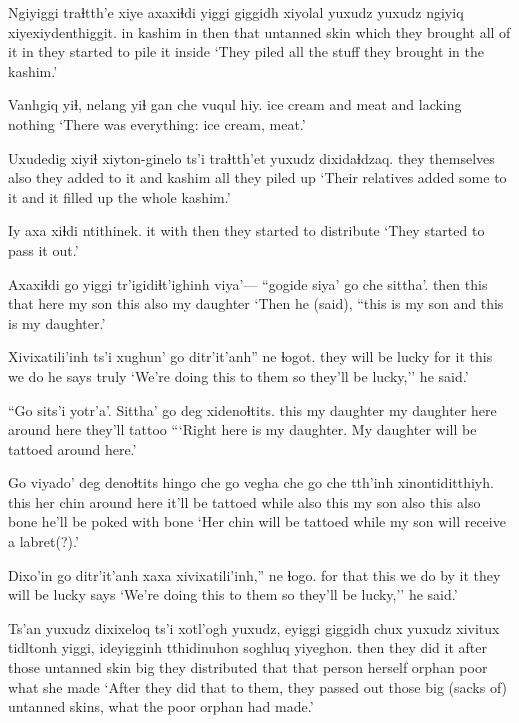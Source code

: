 \documentclass[12pt]{article}
\begin{document}
\gll Ngiyiggi traɬtth'e xiye axaxiɬdi yiggi giggidh       xiyolal           {yuxudz yuxudz} ngiyiq xiyexiydenthiggit. 
in       kashim    in   then   that  {untanned skin} {which they brought} {all of it} in     {they started to pile it inside}
\glt `They piled all the stuff they brought in the kashim.'
\glend

\gll Vanhgiq   yiɬ, nelang yiɬ {gan che vuqul hiy}.
{ice cream} and  meat   and {lacking nothing}
\glt `There was everything: ice cream, meat.'
\glend

\gll Uxudedig        xiyiɬ xiyton-ginelo    ts'i traɬtth'et yuxudz dixidaɬdzaq.
{they themselves} also {they added to it} and  kashim  all    {they piled up}
\glt `Their relatives added some to it and it filled up the whole kashim.'
\glend

\gll Iy axa xiɬdi ntithinek.
it with then  {they started to distribute}
\glt `They started to pass it out.'
\glend

\gll Axaxiɬdi go   yiggi tr'igidiɬt'ighinh viya'---   ``gogide siya'  go   che  sittha'.
then   this that   {}               {} here  {my son} this also {my daughter}
\glt `Then he (said), ``this is my son and this is my daughter.'
\glend

\gll Xivixatili'inh ts'i xughun'   go   ditr'it'anh'' ne ɬogot.
{they will be lucky} {} {for it} this {we do} {he says} truly
\glt `We're doing this to them so they'll be lucky,'' he said.'
\glend

\gll ``Go   {sits'i yotr'a'.} Sittha'     go   deg         xidenoɬtits.
this {my daughter}  {my daughter} here {around here} {they'll tattoo}
\glt ```Right here is my daughter. My daughter will be tattoed around here.'
\glend

\gll Go   viyado'  deg         denoɬtits        hingo che  go   vegha  che  go   che  tth'inh xinontiditthiyh.
this {her chin} {around here} {it'll be tattoed} while also this {my son} also this also bone  {he'll be poked with bone}
\glt `Her chin will be tattoed while my son will receive a labret(?).' 
\glend

\gll Dixo'in   go   ditr'it'anh xaxa  xivixatili'inh,''     ne   ɬogo.
{for that} this {we do}     {by it} {they will be lucky} says
\glt `We're doing this to them so they'll be lucky,'' he said.'
\glend

\gll Ts'an yuxudz dixixeloq   ts'i xotl'ogh yuxudz, eyiggi giggidh       chux yuxudz {xivitux tidltonh} yiggi, ideyigginh tthidinuhon soghluq {yiyeghon.}
then  {}       {they did it}  {}  after {} those  {untanned skin} big {}    {they distributed} that {that person herself}    orphan      poor    {what she made}
\glt `After they did that to them, they passed out those big (sacks of) untanned skins, what the poor orphan had made.'
\glend
\end{document}
